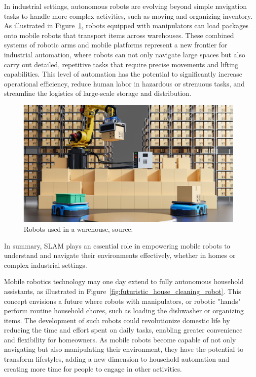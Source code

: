 In industrial settings, autonomous robots are evolving beyond simple navigation tasks to handle more complex activities, such as moving and organizing inventory. As illustrated in Figure~\ref{fig:robots_in_warehouse}, robots equipped with manipulators can load packages onto mobile robots that transport items across warehouses. These combined systems of robotic arms and mobile platforms represent a new frontier for industrial automation, where robots can not only navigate large spaces but also carry out detailed, repetitive tasks that require precise movements and lifting capabilities. This level of automation has the potential to significantly increase operational efficiency, reduce human labor in hazardous or strenuous tasks, and streamline the logistics of large-scale storage and distribution.

\FloatBarrier
\begin{figure}[htbp]
	\centering
	\includegraphics[width=150mm, keepaspectratio]{figures_jpg/warehouse_robots.jpg}
	\caption{Robots used in a warehouse, source:~\cite{robots_in_warehouse}}
	\label{fig:robots_in_warehouse}
\end{figure}
\FloatBarrier

In summary, SLAM plays an essential role in empowering mobile robots to understand and navigate their environments effectively, whether in homes or complex industrial settings.

Mobile robotics technology may one day extend to fully autonomous household assistants, as illustrated in Figure~\ref{fig:futuristic_house_cleaning_robot}. This concept envisions a future where robots with manipulators, or robotic "hands" perform routine household chores, such as loading the dishwasher or organizing items. The development of such robots could revolutionize domestic life by reducing the time and effort spent on daily tasks, enabling greater convenience and flexibility for homeowners. As mobile robots become capable of not only navigating but also manipulating their environment, they have the potential to transform lifestyles, adding a new dimension to household automation and creating more time for people to engage in other activities.

